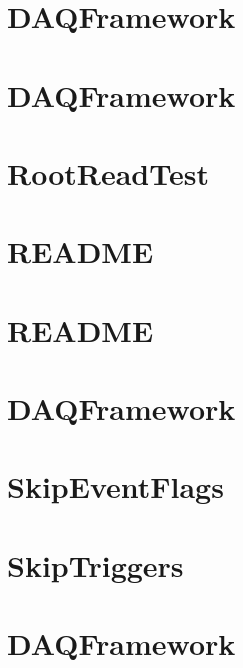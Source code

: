 \let\mypdfximage\pdfximage\def\pdfximage{\immediate\mypdfximage}\documentclass[twoside]{book}
\newcommand{\+}{\discretionary{\mbox{\scriptsize$\hookleftarrow$}}{}{}}
\begin{document}
\chapter{DAQFramework}
\label{md_UserTools_README}

\chapter{DAQFramework}
\label{md_UserTools_RelicMuonPlots_README}

\chapter{Root\+Read\+Test}
\label{md_UserTools_RootReadTest_README}

\chapter{README}
\label{md_UserTools_RunwiseEnergyCut_README}

\chapter{README}
\label{md_UserTools_SimplifyTree_README}

\chapter{DAQFramework}
\label{md_UserTools_SK2p2MeV_README}

\chapter{Skip\+Event\+Flags}
\label{md_UserTools_SkipEventFlags_README}

\chapter{Skip\+Triggers}
\label{md_UserTools_SkipTriggers_README}

\chapter{DAQFramework}
\label{md_UserTools_SLESearch_README}

\end{document}

